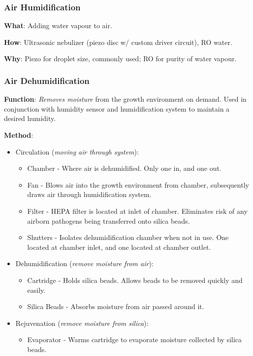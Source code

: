 \documentclass{report}
\begin{document}
\newpage


\subsubsection{Air Humidification}
\label{sec:airhum}

\textbf{What}: Adding water vapour to air.

\textbf{How}: Ultrasonic nebulizer (piezo disc w/ custom driver circuit), RO water.

\textbf{Why}: Piezo for droplet size, commonly used; RO for purity of water vapour.

\subsubsection{Air Dehumidification}
\label{sec:dehum}

\textbf{Function}: \textit{Removes moisture} from the growth environment on demand. Used in conjunction with humidity sensor and humidification system to maintain a desired humidity.

\textbf{Method}:
\begin{itemize}
    \item Circulation (\textit{moving air through system}):
    \begin{itemize}
        \item Chamber - Where air is dehumidified. Only one in, and one out.
        \item Fan - Blows air into the growth environment from chamber, subsequently draws air through humidification system.
        \item Filter - HEPA filter is located at inlet of chamber. Eliminates risk of any airborn pathogens being transferred onto silica beads.
        \item Shutters - Isolates dehumidification chamber when not in use. One located at chamber inlet, and one located at chamber outlet. 
    \end{itemize}
    \item Dehumidification (\textit{remove moisture from air}):
    \begin{itemize}
        \item Cartridge - Holds silica beads. Allows beads to be removed quickly and easily.
        \item Silica Beads - Absorbs moisture from air passed around it.
    \end{itemize}
    \item Rejuvenation (\textit{remove moisture from silica}):
    \begin{itemize}
        \item Evaporator - Warms cartridge to evaporate moisture collected by silica beads.
    \end{itemize}
\end{itemize}
\end{document}
